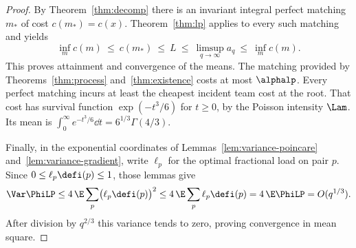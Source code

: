 \begin{proof}
By Theorem~\ref{thm:decomp} there is an invariant integral perfect matching $m_*$ of cost
$c(m_*)=c(x)$. Theorem~\ref{thm:lp} applies to every such matching and yields
\[
\inf_m c(m)\ \le\ c(m_*)\ \le\ L
\ \le\ \limsup_{q\to\infty}a_q\ \le\ \inf_m c(m).
\]
This proves attainment and convergence of the means. The matching provided by
Theorems~\ref{thm:process} and~\ref{thm:existence} costs at most $\alphalp$.
Every perfect matching incurs at least the cheapest incident team cost at the root.
That cost has survival function $\exp(-t^3/6)$ for $t\ge0$, by the Poisson intensity
$\Lam$. Its mean is $\int_0^\infty e^{-t^3/6}\dd t=6^{1/3}\Gamma(4/3)$.

Finally, in the exponential coordinates of Lemmas~\ref{lem:variance-poincare}
and~\ref{lem:variance-gradient}, write $\ell_p$ for the optimal fractional load on pair
$p$. Since $0\le\ell_p\defi(p)\le1$, those lemmas give
\[
\Var\PhiLP
\le 4\,\E\sum_p\bigl(\ell_p\defi(p)\bigr)^2
\le 4\,\E\sum_p\ell_p\defi(p)=4\,\E\PhiLP=O(q^{1/3}).
\]
After division by $q^{2/3}$ this variance tends to zero, proving convergence in mean square.
\end{proof}
